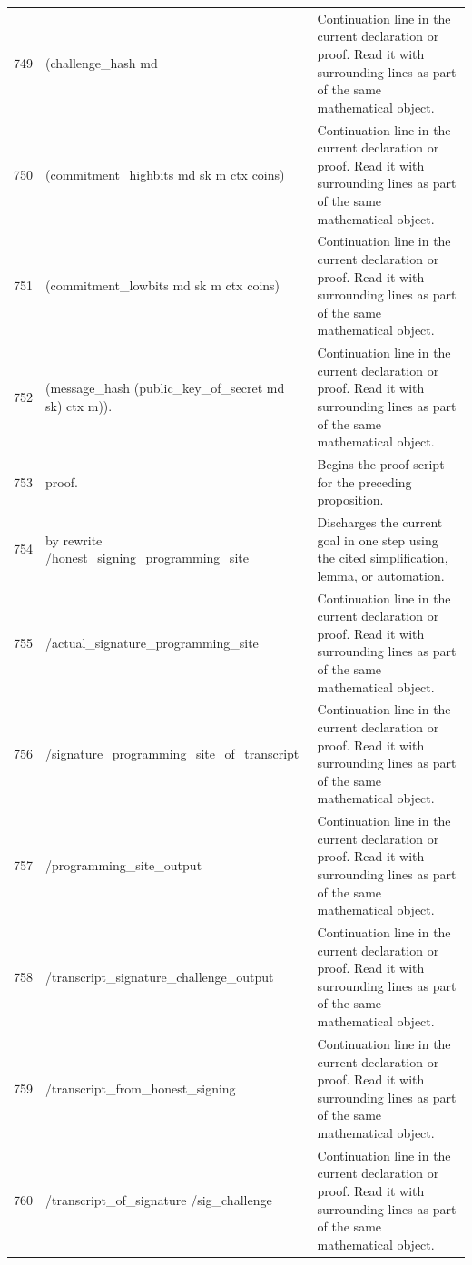 \documentclass[10pt]{article}
\begin{document}
\begin{longtable}{r L{0.53\textwidth} L{0.37\textwidth}}
749 & {\ttfamily\scriptsize     (challenge\_hash md} & Continuation line in the current declaration or proof.  Read it with surrounding lines as part of the same mathematical object. \\
750 & {\ttfamily\scriptsize       (commitment\_highbits md sk m ctx coins)} & Continuation line in the current declaration or proof.  Read it with surrounding lines as part of the same mathematical object. \\
751 & {\ttfamily\scriptsize       (commitment\_lowbits md sk m ctx coins)} & Continuation line in the current declaration or proof.  Read it with surrounding lines as part of the same mathematical object. \\
752 & {\ttfamily\scriptsize       (message\_hash (public\_key\_of\_secret md sk) ctx m)).} & Continuation line in the current declaration or proof.  Read it with surrounding lines as part of the same mathematical object. \\
753 & {\ttfamily\scriptsize proof.} & Begins the proof script for the preceding proposition. \\
754 & {\ttfamily\scriptsize by rewrite /honest\_signing\_programming\_site} & Discharges the current goal in one step using the cited simplification, lemma, or automation. \\
755 & {\ttfamily\scriptsize            /actual\_signature\_programming\_site} & Continuation line in the current declaration or proof.  Read it with surrounding lines as part of the same mathematical object. \\
756 & {\ttfamily\scriptsize            /signature\_programming\_site\_of\_transcript} & Continuation line in the current declaration or proof.  Read it with surrounding lines as part of the same mathematical object. \\
757 & {\ttfamily\scriptsize            /programming\_site\_output} & Continuation line in the current declaration or proof.  Read it with surrounding lines as part of the same mathematical object. \\
758 & {\ttfamily\scriptsize            /transcript\_signature\_challenge\_output} & Continuation line in the current declaration or proof.  Read it with surrounding lines as part of the same mathematical object. \\
759 & {\ttfamily\scriptsize            /transcript\_from\_honest\_signing} & Continuation line in the current declaration or proof.  Read it with surrounding lines as part of the same mathematical object. \\
760 & {\ttfamily\scriptsize            /transcript\_of\_signature /sig\_challenge} & Continuation line in the current declaration or proof.  Read it with surrounding lines as part of the same mathematical object. \\

\end{longtable}
\end{document}

